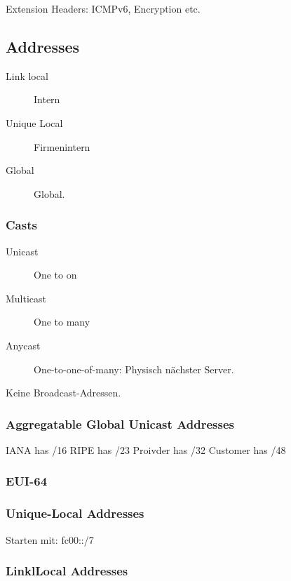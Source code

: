 Extension Headers: ICMPv6, Encryption etc.

\subsection{Addresses}

\begin{description}
	\item[Link local] Intern
	\item[Unique Local] Firmenintern
	\item[Global] Global.
\end{description}

\subsubsection{Casts}

\begin{description}
\item[Unicast] One to on

\item[Multicast] One to many

\item[Anycast] One-to-one-of-many: Physisch nächster Server.
\end{description}

Keine Broadcast-Adressen.


\subsubsection{Aggregatable Global Unicast Addresses}


IANA has /16
RIPE has /23
Proivder has /32
Customer has /48

\subsubsection{EUI-64}


\subsubsection{Unique-Local Addresses}

Starten mit: fc00::/7

\subsubsection{LinklLocal Addresses}

